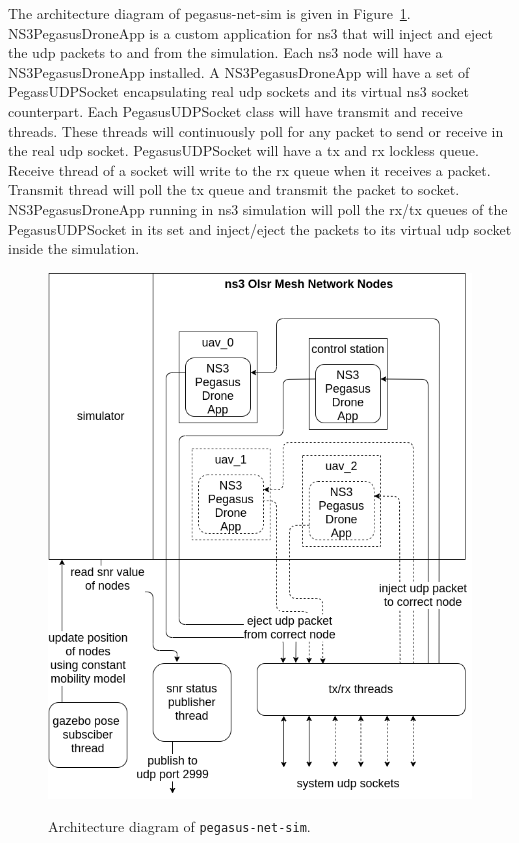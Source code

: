 The architecture diagram of pegasus-net-sim is given in Figure~\ref{fig:pegasus-net-sim}. NS3PegasusDroneApp is a custom application for ns3 that will inject and eject the udp packets to and from the simulation. Each ns3 node will have a NS3PegasusDroneApp installed. A NS3PegasusDroneApp will have a set of PegassUDPSocket encapsulating real udp sockets and its virtual ns3 socket counterpart. Each PegasusUDPSocket class will have transmit and receive threads. These threads will continuously poll for any packet to send or receive in the real udp socket. PegasusUDPSocket will have a tx and rx lockless queue. Receive thread of a socket will write to the rx queue when it receives a packet. Transmit thread will poll the tx queue and transmit the packet to socket. NS3PegasusDroneApp running in ns3 simulation will poll the rx/tx queues of the PegasusUDPSocket in its set and inject/eject the packets to its virtual udp socket inside the simulation.

\begin{figure}
	\centering
	\caption[Architecture of \texttt{pegasus-net-sim}]{\small Architecture diagram of \texttt{pegasus-net-sim}.}
	\includegraphics[width=5in]{figures/methodology/methodology-pegasus-net-sim}
	\label{fig:pegasus-net-sim}
\end{figure}

